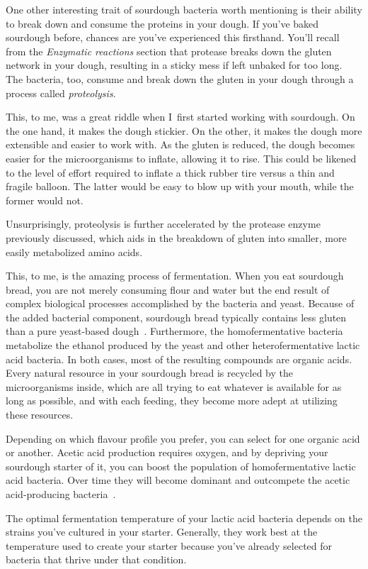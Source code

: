 One other interesting trait of sourdough bacteria worth mentioning is their
ability to break down and consume the proteins in your dough. If you've baked
sourdough before, chances are you've experienced this firsthand. You'll recall
from the \emph{Enzymatic reactions} section that protease breaks down the
gluten network in your dough, resulting in a sticky mess if left unbaked for
too long. The bacteria, too, consume and break down the gluten in your
dough through a process called \emph{proteolysis}.

This, to me, was a great riddle when I~first started working with sourdough.
On the one hand, it makes the dough stickier. On the other, it makes the dough
more extensible and easier to work with. As the gluten is reduced, the dough
becomes easier for the microorganisms to inflate, allowing it to rise. This
could be likened to the level of effort required to inflate a thick rubber tire
versus a thin and fragile balloon. The latter would be easy to blow up with
your mouth, while the former would not.

Unsurprisingly, proteolysis is further accelerated by the protease enzyme
previously discussed, which aids in the breakdown of gluten into smaller,
more easily metabolized amino acids.

This, to me, is the amazing process of fermentation. When you eat sourdough
bread, you are not merely consuming flour and water but the end result of
complex biological processes accomplished by the bacteria and yeast. Because
of the added bacterial component, sourdough bread typically contains less
gluten than a pure yeast-based dough~\cite{proteolysis+sourdough+bacteria}.
Furthermore, the homofermentative bacteria metabolize the ethanol produced by
the yeast and other heterofermentative lactic acid bacteria. In both cases,
most of the resulting compounds are organic acids. Every natural resource in
your sourdough bread is recycled by the microorganisms inside, which are all
trying to eat whatever is available for as long as possible, and with each
feeding, they become more adept at utilizing these resources.

Depending on which flavour profile you prefer, you can select for one organic
acid or another. Acetic acid production requires oxygen, and by depriving
your sourdough starter of it, you can boost the population of homofermentative
lactic acid bacteria. Over time they will become dominant and outcompete the
acetic acid-producing bacteria~\cite{acetic+acid+oxygen}.

The optimal fermentation temperature of your lactic acid bacteria depends on
the strains you've cultured in your starter. Generally, they work best at the
temperature used to create your starter because you've already selected for
bacteria that thrive under that condition.

